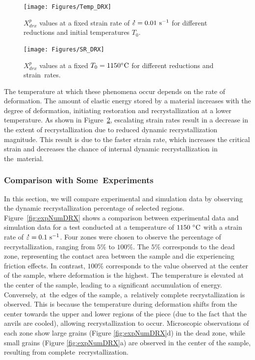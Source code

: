 \documentclass[metals,article,accept,pdftex,moreauthors]{Definitions/mdpi}
\DeclareRobustCommand{\mdot}[1]{\accentset{\mbox{\bfseries .}}{#1}}
\DeclareRobustCommand{\ps}{\text{s}^{-1}}
\begin{document}
\begin{figure}[H]
\centering
\texttt{[image: Figures/Temp\_DRX]}
\caption{$X_{drx}^{p}$ %
 values at a fixed strain rate of $\mdot{\varepsilon}=0.01~\ps$ for different reductions and initial temperatures $T_0$.}
\label{fig:TempEffect}
\end{figure}
\unskip
\begin{figure}[H]
\centering
\texttt{[image: Figures/SR\_DRX]}
\caption{$X_{drx}^{p}$ %
 values at a fixed $T_0=1150\celsius$ for different reductions and strain~rates.}
\label{fig:SREffect}
\end{figure}

The temperature at which these phenomena occur depends on the rate of deformation.
The amount of elastic energy stored by a material increases with the degree of deformation, initiating restoration and recrystallization at a lower temperature.
As shown in Figure~\ref{fig:SREffect}, escalating strain rates result in a decrease in the extent of recrystallization due to reduced dynamic recrystallization magnitude.
This result is due to the faster strain rate, which increases the critical strain and decreases the chance of internal dynamic recrystallization in the~material.

\subsubsection{Comparison with Some~Experiments}\label{subsec:ExpValid}

In this section, we will compare experimental and simulation data by observing the dynamic recrystallization percentage of selected regions.
Figure~\ref{fig:expNumDRX} shows a comparison between experimental data and simulation data for a test conducted at a temperature of $1150~\celsius$ with a strain rate of $\mdot{\varepsilon}=0.1~\ps$.
Four zones were chosen to observe the percentage of recrystallization, ranging from $5\%$ to $100\%$.
The $5\%$ corresponds to the dead zone, representing the contact area between the sample and die experiencing friction effects.
In contrast, $100\%$ corresponds to the value observed at the center of the sample, where deformation is the highest.
The temperature is elevated at the center of the sample, leading to a significant accumulation of energy.
Conversely, at~the edges of the sample, a~relatively complete recrystallization is observed.
This is because the temperature during deformation shifts from the center towards the upper and lower regions of the piece (due to the fact that the anvils are cooled), allowing recrystallization to occur.
Microscopic observations of each zone show large grains (Figure \ref{fig:expNumDRX}d) in the dead zone, while small grains (Figure \ref{fig:expNumDRX}a) are observed in the center of the sample, resulting from complete~recrystallization.
\end{document}
